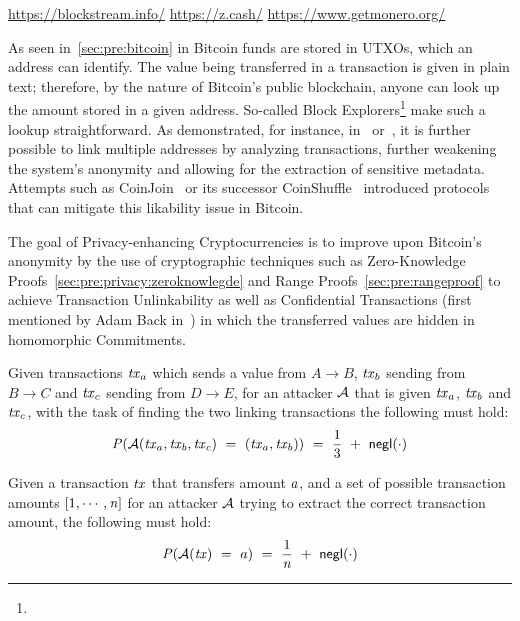 \urldef\urlblockexp\url{https://blockstream.info/}
\urldef\urlzcash\url{https://z.cash/}
\urldef\urlmonero\url{https://www.getmonero.org/}

As seen in~\cref{sec:pre:bitcoin} in Bitcoin funds are stored in UTXOs, which an address can identify.
The value being transferred in a transaction is given in plain text; therefore, by the nature of Bitcoin’s public blockchain, anyone can look up the amount stored in a given address.
So-called Block Explorers\footnote{\urlblockexp} make such a lookup straightforward.
As demonstrated, for instance, in~\cite{barber2012bitter} or~\cite{reid2013analysis}, it is further possible to link multiple addresses by analyzing transactions, further weakening the system's anonymity and allowing for the extraction of sensitive metadata.
Attempts such as CoinJoin~\cite{maxwell2013coinjoin} or its successor CoinShuffle~\cite{ruffing2014coinshuffle} introduced protocols that can mitigate this likability issue in Bitcoin.

The goal of Privacy-enhancing Cryptocurrencies is to improve upon Bitcoin's anonymity by the use of cryptographic techniques such as Zero-Knowledge Proofs~\cref{sec:pre:privacy:zeroknowlegde} and Range Proofs~\cref{sec:pre:rangeproof} to achieve Transaction Unlinkability as well as Confidential Transactions (first mentioned by Adam Back in~\cite{back2013confidentialtx}) in which the transferred values are hidden in homomorphic Commitments.

\begin{definition} \label{def:pre:privacy:tx-unlink}
    Given transactions $\mathit{tx}_a$ which sends a value from $A \rightarrow B$, $\mathit{tx}_b$ sending from $B \rightarrow C$ and $\mathit{tx}_c$ sending from $D \rightarrow E$, for an attacker $\mathcal{A}$ that is given $\mathit{tx}_a$, $\mathit{tx}_b$ and $\mathit{tx}_c$, with the task of finding the two linking transactions the following must hold:
    \[ \mathit{P}(\mathcal{A}(\mathit{tx}_a, \mathit{tx}_b, \mathit{tx}_c) ~=~ (\mathit{tx}_a, \mathit{tx}_b)) ~=~ \frac{1}{3} ~+~ \mathsf{negl}(\cdot)\]
\end{definition}

\begin{definition} \label{def:pre:privacy:conf-tx}
    Given a transaction $\mathit{tx}$ that transfers amount $a$, and a set of possible transaction amounts $[1,\cdots,\mathit{n}]$ for an attacker $\mathcal{A}$ trying to extract the correct transaction amount, the following must hold:
    \[ \mathit{P}(\mathcal{A}(\mathit{tx}) ~=~ a) ~=~ \frac{1}{\mathit{n}} ~+~ \mathsf{negl}(\cdot) \]
\end{definition}

